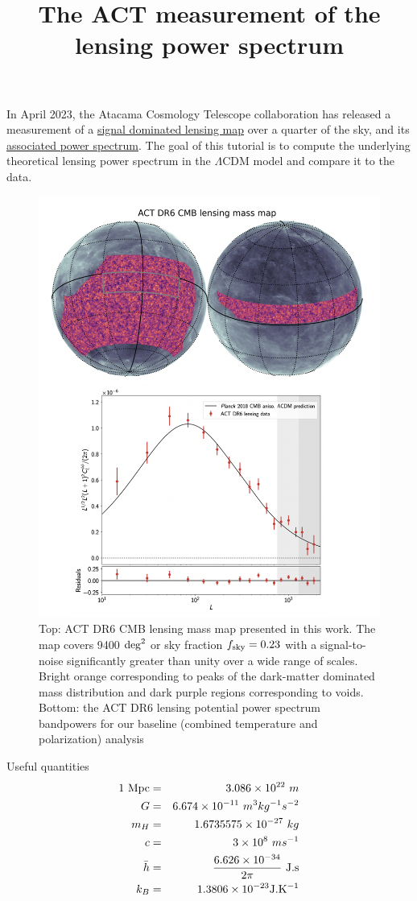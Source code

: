 \documentclass[a4paper, 11pt]{article}
\title{The ACT measurement of the lensing power spectrum}
\def\ba{\begin{eqnarray}}
\def\ea{\end{eqnarray}}
\begin{document}
\maketitle

In April 2023, the Atacama Cosmology Telescope collaboration has released a measurement of a \href{https://arxiv.org/abs/2304.05203}{signal dominated lensing map} over a quarter of the sky, and its \href{https://arxiv.org/abs/2304.05202}{associated power spectrum}. The goal of this tutorial is to compute 
the underlying theoretical lensing power spectrum in the $\Lambda$CDM model and compare it to the data.

\begin{figure}[h!]
  \centering
  \includegraphics[width=0.7\columnwidth]{lensing_dr6.png}
  \caption{Top: ACT DR6 CMB lensing mass map presented in this work. The map covers 9400 ${\rm deg}^{2}$
or sky fraction $f_{\rm sky} = 0.23$ with a signal-to-noise significantly greater than unity over a wide range of scales. Bright orange corresponding to peaks of the dark-matter dominated mass distribution and
dark purple regions corresponding to voids. Bottom: the ACT DR6 lensing potential power spectrum bandpowers for our baseline (combined temperature and polarization) analysis}
  \label{fig:dr6_lensing}
\end{figure}



Useful quantities
\ba
1 \ \rm{Mpc} &=& 3.086 \times 10^{22} \ m \nonumber \\
G &=& 6.674 \times 10^{-11}  \  m^{3} kg^{-1} s^{-2} \nonumber \\
m_{H} &=& 1.6735575  \times10^{-27}  \ kg\nonumber \\
c &=& 3 \times 10^{8} \ m s^{-1} \nonumber \\
\bar{h} &=& \frac{ 6.626 \times 10^{-34}}{ 2\pi}  \  \rm J . s \nonumber \\
k_{B} &=&  1.3806 \times 10^{-23} \rm J.K^{-1}
\ea
\end{document}
